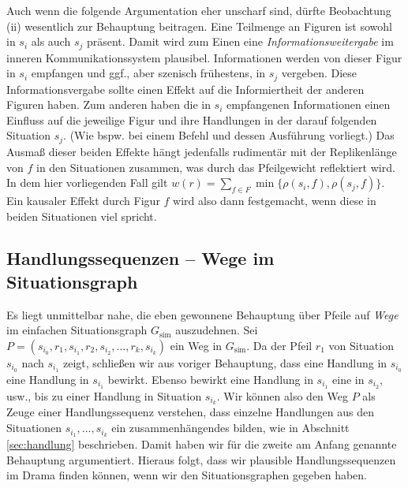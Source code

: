 \documentclass[a4paper,10pt,abstract=true,headings=small]{scrartcl}
\begin{document}
Auch wenn die folgende Argumentation eher unscharf sind, dürfte Beobachtung (ii) wesentlich zur Behauptung beitragen.
Eine Teilmenge an Figuren ist sowohl in $s_i$ als auch $s_j$ präsent.
Damit wird zum Einen eine \emph{Informationsweitergabe} im inneren Kommunikationssystem plausibel.\autocite[Vgl.][Absch.~3]{pfister_drama:_2001}
Informationen werden von dieser Figur in $s_i$ empfangen und ggf., aber szenisch frühestens, in $s_j$ vergeben.
Diese Informationsvergabe sollte einen Effekt auf die Informiertheit der anderen Figuren haben.
Zum anderen haben die in $s_i$ empfangenen Informationen einen Einfluss auf die jeweilige Figur und ihre Handlungen in der darauf folgenden Situation $s_j$. (Wie bspw. bei einem Befehl und dessen Ausführung vorliegt.)
Das Ausmaß dieser beiden Effekte hängt jedenfalls rudimentär mit der Replikenlänge von $f$ in den Situationen zusammen, was durch das Pfeilgewicht reflektiert wird.
In dem hier vorliegenden Fall gilt $w(r) = \sum_{f\in F} \min \{ \rho(s_i, f), \rho(s_j, f) \}$.
Ein kausaler Effekt durch Figur $f$ wird also dann festgemacht, wenn diese in beiden Situationen viel spricht.


\subsection{Handlungssequenzen – Wege im Situationsgraph}\label{sec:wege}


Es liegt unmittelbar nahe, die eben gewonnene Behauptung über Pfeile auf \emph{Wege} im einfachen Situationsgraph $G_\text{sim}$ auszudehnen.
Sei $P=(s_{i_0}, r_1, s_{i_1}, r_2, s_{i_2}, \dots, r_k, s_{i_k})$ ein Weg in $G_\text{sim}$. 
Da der Pfeil $r_1$ von Situation $s_{i_0}$ nach $s_{i_1}$ zeigt, schließen wir aus voriger Behauptung, dass eine Handlung in $s_{i_0}$ eine Handlung in $s_{i_1}$ bewirkt.
Ebenso bewirkt eine Handlung in $s_{i_1}$ eine in $s_{i_2}$, usw., bis zu einer Handlung in Situation $s_{i_k}$.
Wir können also den Weg $P$ als Zeuge einer Handlungssequenz verstehen, dass einzelne Handlungen aus den Situationen $s_{i_1}, \dots, s_{i_k}$ ein zusammenhängendes  bilden, wie in Abschnitt \ref{sec:handlung} beschrieben.
Damit haben wir für die zweite am Anfang genannte Behauptung argumentiert.
Hieraus folgt, dass wir plausible Handlungssequenzen im Drama finden können, wenn wir den Situationsgraphen gegeben haben. 
\end{document}
